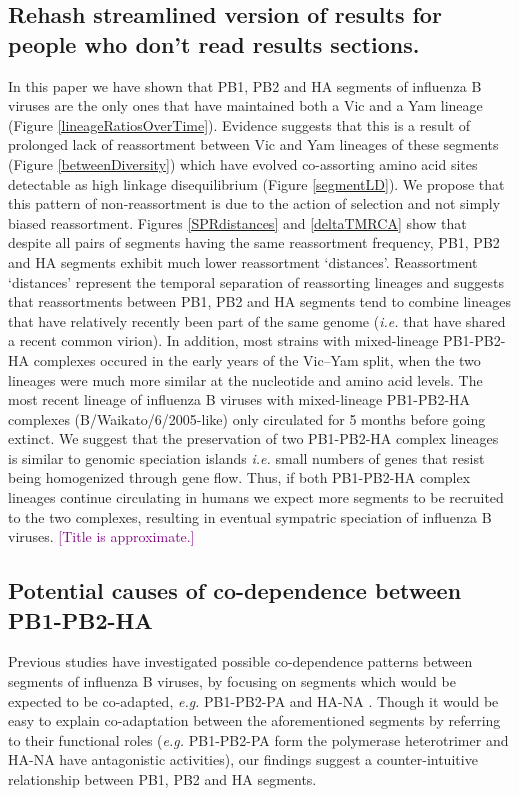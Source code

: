 \documentclass[11pt,oneside,letterpaper]{article}
\def\tbc#1{\textcolor{purple}{[#1]}}
\begin{document}
\subsection*{Rehash streamlined version of results for people who don't read results sections.}
In this paper we have shown that PB1, PB2 and HA segments of influenza B viruses are the only ones that have maintained both a Vic and a Yam lineage (Figure \ref{lineageRatiosOverTime}).
Evidence suggests that this is a result of prolonged lack of reassortment between Vic and Yam lineages of these segments (Figure \ref{betweenDiversity}) which have evolved co-assorting amino acid sites detectable as high linkage disequilibrium (Figure \ref{segmentLD}).
We propose that this pattern of non-reassortment is due to the action of selection and not simply biased reassortment.
Figures \ref{SPRdistances} and \ref{deltaTMRCA} show that despite all pairs of segments having the same reassortment frequency, PB1, PB2 and HA segments exhibit much lower reassortment `distances'.
Reassortment `distances' represent the temporal separation of reassorting lineages and suggests that reassortments between PB1, PB2 and HA segments tend to combine lineages that have relatively recently been part of the same genome (\textit{i.e.} that have shared a recent common virion).
In addition, most strains with mixed-lineage PB1-PB2-HA complexes occured in the early years of the Vic--Yam split, when the two lineages were much more similar at the nucleotide and amino acid levels.
The most recent lineage of influenza B viruses with mixed-lineage PB1-PB2-HA complexes (B/Waikato/6/2005-like) only circulated for 5 months before going extinct.
We suggest that the preservation of two PB1-PB2-HA complex lineages is similar to genomic speciation islands \textit{i.e.} small numbers of genes that resist being homogenized through gene flow.
Thus, if both PB1-PB2-HA complex lineages continue circulating in humans we expect more segments to be recruited to the two complexes, resulting in eventual sympatric speciation of influenza B viruses. 
\tbc{Title is approximate.}

\subsection*{Potential causes of co-dependence between PB1-PB2-HA}
Previous studies have investigated possible co-dependence patterns between segments of influenza B viruses, by focusing on segments which would be expected to be co-adapted, \textit{e.g.} PB1-PB2-PA and HA-NA \cite{mccullers2004}.
Though it would be easy to explain co-adaptation between the aforementioned segments by referring to their functional roles (\textit{e.g.} PB1-PB2-PA form the polymerase heterotrimer and HA-NA have antagonistic activities), our findings suggest a counter-intuitive relationship between PB1, PB2 and HA segments.
\end{document}
